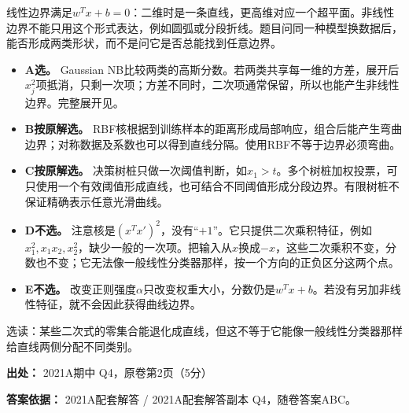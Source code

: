 线性边界满足\(w^Tx+b=0\)：二维时是一条直线，更高维对应一个超平面。非线性边界不能只用这个形式表达，例如圆弧或分段折线。题目问同一种模型换数据后，能否形成两类形状，而不是问它是否总能找到任意边界。



\begin{itemize}

\item \textbf{A选。} Gaussian NB比较两类的高斯分数。若两类共享每一维的方差，展开后\(x_j^2\)项抵消，只剩一次项；方差不同时，二次项通常保留，所以也能产生非线性边界。完整展开见。

\item \textbf{B按原解选。} RBF核根据到训练样本的距离形成局部响应，组合后能产生弯曲边界；对称数据及系数也可以得到直线分隔。使用RBF不等于边界必须弯曲。

\item \textbf{C按原解选。} 决策树桩只做一次阈值判断，如\(x_1>t\)。多个树桩加权投票，可只使用一个有效阈值形成直线，也可结合不同阈值形成分段边界。有限树桩不保证精确表示任意光滑曲线。

\item \textbf{D不选。} 注意核是\((x^Tx')^2\)，没有“\(+1\)”。它只提供二次乘积特征，例如\(x_1^2,x_1x_2,x_2^2\)，缺少一般的一次项。把输入从\(x\)换成\(-x\)，这些二次乘积不变，分数也不变；它无法像一般线性分类器那样，按一个方向的正负区分这两个点。

\item \textbf{E不选。} 改变正则强度\(\alpha\)只改变权重大小，分数仍是\(w^Tx+b\)。若没有另加非线性特征，就不会因此获得曲线边界。

\end{itemize}


选读：某些二次式的零集合能退化成直线，但这不等于它能像一般线性分类器那样给直线两侧分配不同类别。


\textbf{出处：} 2021A期中 Q4，原卷第2页（5分）


\textbf{答案依据：} 2021A配套解答 / 2021A配套解答副本 Q4，随卷答案ABC。
